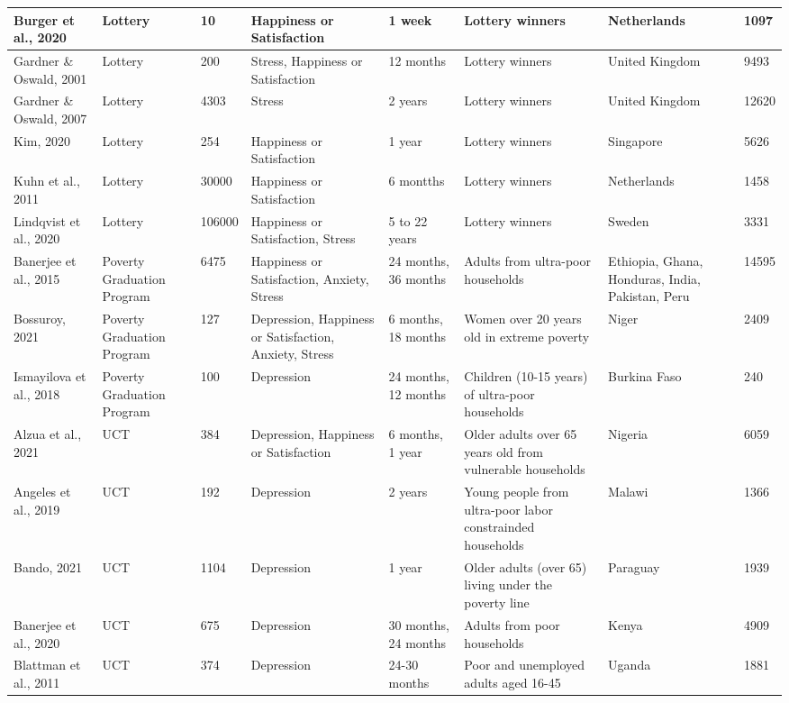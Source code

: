 \begin{longtable}{p{1.8cm}p{1.7cm}p{1.3 cm}p{1.8cm}p{1.7cm}p{2cm}p{1.2cm}p{1cm}}
   \hline
Burger et al., 2020 & Lottery & 10 & Happiness or Satisfaction & 1 week & Lottery winners & Netherlands & 1097 \\ 
   \hline
Gardner \& Oswald, 2001 & Lottery & 200 & Stress, Happiness or Satisfaction & 12 months & Lottery winners & United Kingdom & 9493 \\ 
   \hline
Gardner \& Oswald, 2007 & Lottery & 4303 & Stress & 2 years & Lottery winners & United Kingdom & 12620 \\ 
   \hline
Kim, 2020 & Lottery & 254 & Happiness or Satisfaction & 1 year & Lottery winners & Singapore & 5626 \\ 
   \hline
Kuhn et al., 2011 & Lottery & 30000 & Happiness or Satisfaction & 6 montths & Lottery winners & Netherlands & 1458 \\ 
   \hline
Lindqvist et al., 2020 & Lottery & 106000 & Happiness or Satisfaction, Stress & 5 to 22 years & Lottery winners & Sweden & 3331 \\ 
   \hline
Banerjee et al., 2015 & Poverty Graduation Program & 6475 & Happiness or Satisfaction, Anxiety, Stress & 24 months, 36 months & Adults from ultra-poor households & Ethiopia, Ghana, Honduras, India, Pakistan, Peru & 14595 \\ 
   \hline
Bossuroy, 2021 & Poverty Graduation Program & 127 & Depression, Happiness or Satisfaction, Anxiety, Stress & 6 months, 18 months & Women over 20 years old in extreme poverty & Niger & 2409 \\ 
   \hline
Ismayilova et al., 2018 & Poverty Graduation Program & 100 & Depression & 24 months, 12 months & Children (10-15 years) of ultra-poor households & Burkina Faso & 240 \\ 
   \hline
Alzua et al., 2021 & UCT & 384 & Depression, Happiness or Satisfaction & 6 months, 1 year & Older adults over 65 years old from vulnerable households & Nigeria & 6059 \\ 
   \hline
Angeles et al., 2019 & UCT & 192 & Depression & 2 years & Young people from ultra-poor labor constrainded households & Malawi & 1366 \\ 
   \hline
Bando, 2021 & UCT & 1104 & Depression & 1 year & Older adults (over 65) living under the poverty line & Paraguay & 1939 \\ 
   \hline
Banerjee et al., 2020 & UCT & 675 & Depression & 30 months, 24 months & Adults from poor households & Kenya & 4909 \\ 
   \hline
Blattman et al., 2011 & UCT & 374 & Depression & 24-30 months & Poor and unemployed adults aged 16-45 & Uganda & 1881 \\ 

\end{longtable}
